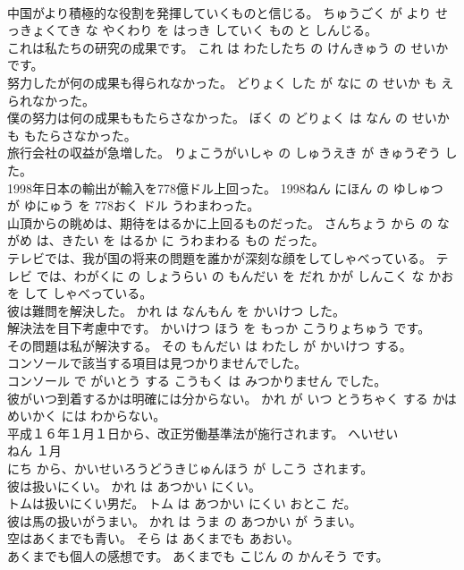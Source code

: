\documentclass[8pt]{extreport}
\begin{document}
\begin{CJK}{UTF8}{min}
\\	中国がより積極的な役割を発揮していくものと信じる。	ちゅうごく が より せっきょくてき な やくわり を はっき していく もの と しんじる。	
\\	これは私たちの研究の成果です。	これ は わたしたち の けんきゅう の せいか です。	
\\	努力したが何の成果も得られなかった。	どりょく した が なに の せいか も えられなかった。	
\\	僕の努力は何の成果ももたらさなかった。	ぼく の どりょく は なん の せいか も もたらさなかった。	
\\	旅行会社の収益が急増した。	りょこうがいしゃ の しゅうえき が きゅうぞう した。	
\\	1998年日本の輸出が輸入を778億ドル上回った。	1998ねん にほん の ゆしゅつ が ゆにゅう を 778おく ドル うわまわった。	
\\	山頂からの眺めは、期待をはるかに上回るものだった。	さんちょう から の ながめ は、きたい を はるか に うわまわる もの だった。	
\\	テレビでは、我が国の将来の問題を誰かが深刻な顔をしてしゃべっている。	テレビ では、わがくに の しょうらい の もんだい を だれ かが しんこく な かお を して しゃべっている。	
\\	彼は難問を解決した。	かれ は なんもん を かいけつ した。	
\\	解決法を目下考慮中です。	かいけつ ほう を もっか こうりょちゅう です。	
\\	その問題は私が解決する。	その もんだい は わたし が かいけつ する。	
\\	コンソールで該当する項目は見つかりませんでした。	
\\	コンソール で がいとう する こうもく は みつかりません でした。	
\\	彼がいつ到着するかは明確には分からない。	かれ が いつ とうちゃく する かは めいかく には わからない。	
\\	平成１６年１月１日から、改正労働基準法が施行されます。	へいせい 
\\	ねん １月 
\\	にち から、かいせいろうどうきじゅんほう が しこう されます。	
\\	彼は扱いにくい。	かれ は あつかい にくい。	
\\	トムは扱いにくい男だ。	トム は あつかい にくい おとこ だ。	
\\	彼は馬の扱いがうまい。	かれ は うま の あつかい が うまい。	
\\	空はあくまでも青い。	そら は あくまでも あおい。	
\\	あくまでも個人の感想です。	あくまでも こじん の かんそう です。	

\end{CJK}
\end{document}
